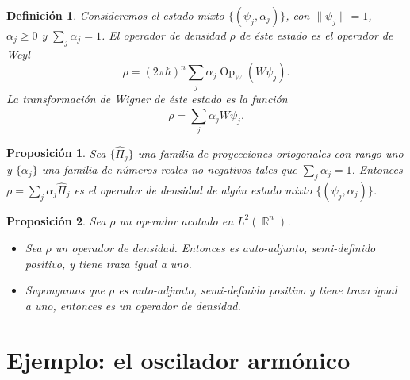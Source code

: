 \documentclass[a4paper]{report}
\DeclareMathOperator{\R}{\mathbb{R}}
\DeclareMathOperator{\Op}{Op}
\newtheorem{definition}{Definición}
\newtheorem{proposition}{Proposición}
\begin{document}
  \begin{definition}
    Consideremos el estado mixto $\{(\psi_j,\alpha_j)\}$,
    con $\|\psi_j\| = 1$, $\alpha_j \geq 0$ y $\sum_{j}^{}
    \alpha_j = 1$. El operador de densidad $\rho$ de
    éste estado es el operador de Weyl
    \begin{equation}
      \rho
      = (2\pi\hbar)^{n} \sum_{j}^{} \alpha_j \Op_W(W\psi_j).
    \end{equation}
    La transformación de Wigner de éste estado es la función
    \begin{equation}
      \rho = \sum_{j}^{} \alpha_j W\psi_j.
    \end{equation}
  \end{definition}

  \begin{proposition}
    Sea $\{\hat{\Pi}_j\}$ una familia de proyecciones
    ortogonales con rango uno y $\{\alpha_j\}$ una familia
    de números reales no negativos tales que $\sum_j
    \alpha_j = 1$. Entonces $\rho = \sum_{j}^{}
    \alpha_j \hat{\Pi}_j$ es el operador de densidad de
    algún estado mixto $\{(\psi_j,\alpha_j)\}$.
  \end{proposition}

  \begin{proposition}
    Sea $\rho$ un operador acotado en $L^2(\R^{n})$.
    \begin{itemize}
      \item Sea $\rho$ un operador de densidad.
        Entonces es auto-adjunto, semi-definido positivo, y
        tiene traza igual a uno.
      \item Supongamos que $\rho$ es auto-adjunto,
        semi-definido positivo y tiene traza igual a uno,
        entonces es un operador de densidad.
    \end{itemize}
  \end{proposition}

  \section{Ejemplo: el oscilador armónico}
\end{document}
